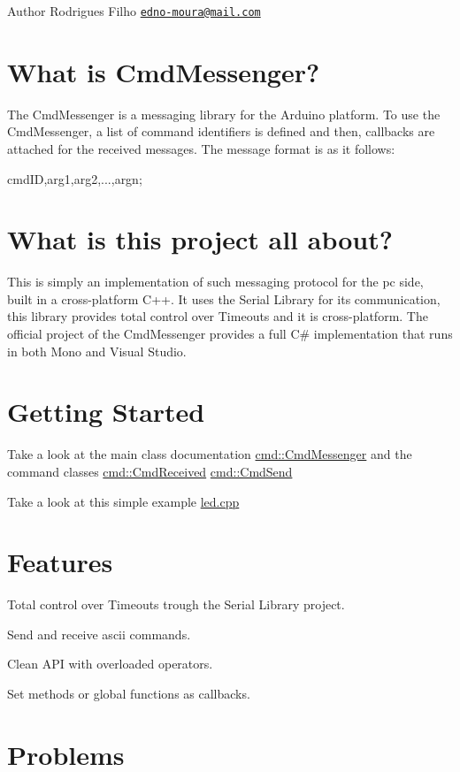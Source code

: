 \begin{DoxyAuthor}{Author}
Rodrigues Filho \href{mailto:edno-moura@mail.com}{\tt edno-\/moura@mail.\+com}
\end{DoxyAuthor}
\hypertarget{index_what_is}{}\section{What is Cmd\+Messenger?}\label{index_what_is}
The Cmd\+Messenger is a messaging library for the Arduino platform. To use the Cmd\+Messenger, a list of command identifiers is defined and then, callbacks are attached for the received messages. The message format is as it follows\+: 
\begin{DoxyPre}
  cmdID,arg1,arg2,...,argn;
\end{DoxyPre}
\hypertarget{index_this_project}{}\section{What is this project all about?}\label{index_this_project}
This is simply an implementation of such messaging protocol for the pc side, built in a cross-\/platform C++. It uses the Serial Library for its communication, this library provides total control over Timeouts and it is cross-\/platform. The official project of the Cmd\+Messenger provides a full C\# implementation that runs in both Mono and Visual Studio.\hypertarget{index_getting_started}{}\section{Getting Started}\label{index_getting_started}
Take a look at the main class documentation \hyperlink{classcmd_1_1_cmd_messenger}{cmd\+::\+Cmd\+Messenger} and the command classes \hyperlink{classcmd_1_1_cmd_received}{cmd\+::\+Cmd\+Received} \hyperlink{classcmd_1_1_cmd_send}{cmd\+::\+Cmd\+Send}

Take a look at this simple example \hyperlink{led_8cpp}{led.\+cpp}\hypertarget{index_features}{}\section{Features}\label{index_features}

\begin{DoxyItemize}
\item Total control over Timeouts trough the Serial Library project.
\item Send and receive ascii commands.
\item Clean A\+P\+I with overloaded operators.
\item Set methods or global functions as callbacks.
\end{DoxyItemize}\hypertarget{index_problems}{}\section{Problems}\label{index_problems}

